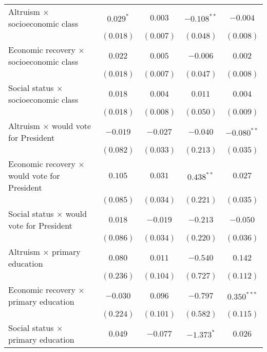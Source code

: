 \begin{table}
\begin{center}
\begin{tabular}{l c c c c}
Altruism $\times$ socioeconomic class               & $0.029^{*}$    & $0.003$       & $-0.108^{**}$ & $-0.004$      \\
                                                    & $(0.018)$      & $(0.007)$     & $(0.048)$     & $(0.008)$     \\
Economic recovery $\times$ socioeconomic class      & $0.022$        & $0.005$       & $-0.006$      & $0.002$       \\
                                                    & $(0.018)$      & $(0.007)$     & $(0.047)$     & $(0.008)$     \\
Social status $\times$ socioeconomic class          & $0.018$        & $0.004$       & $0.011$       & $0.004$       \\
                                                    & $(0.018)$      & $(0.008)$     & $(0.050)$     & $(0.009)$     \\
Altruism $\times$ would vote for President          & $-0.019$       & $-0.027$      & $-0.040$      & $-0.080^{**}$ \\
                                                    & $(0.082)$      & $(0.033)$     & $(0.213)$     & $(0.035)$     \\
Economic recovery $\times$ would vote for President & $0.105$        & $0.031$       & $0.438^{**}$  & $0.027$       \\
                                                    & $(0.085)$      & $(0.034)$     & $(0.221)$     & $(0.035)$     \\
Social status $\times$ would vote for President     & $0.018$        & $-0.019$      & $-0.213$      & $-0.050$      \\
                                                    & $(0.086)$      & $(0.034)$     & $(0.220)$     & $(0.036)$     \\
Altruism $\times$ primary education                 & $0.080$        & $0.011$       & $-0.540$      & $0.142$       \\
                                                    & $(0.236)$      & $(0.104)$     & $(0.727)$     & $(0.112)$     \\
Economic recovery $\times$ primary education        & $-0.030$       & $0.096$       & $-0.797$      & $0.350^{***}$ \\
                                                    & $(0.224)$      & $(0.101)$     & $(0.582)$     & $(0.115)$     \\
Social status $\times$ primary education            & $0.049$        & $-0.077$      & $-1.373^{*}$  & $0.026$       \\

\end{tabular}
\end{center}
\end{table}
